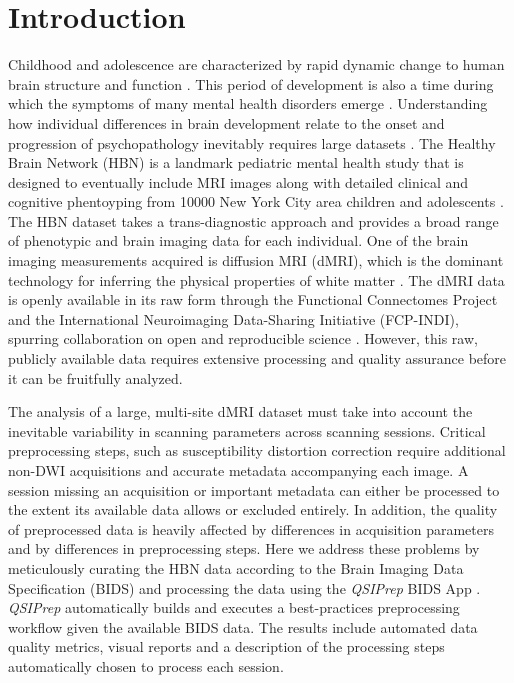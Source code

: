 \documentclass[9pt,lineno]{elife}
\begin{document}
\section{Introduction}

Childhood and adolescence are characterized by rapid dynamic change to human brain
structure and function \citep{Lebel2018-oy}. This period of development is also a time during which the
symptoms of many mental health disorders emerge \citep{Paus2008-gi}.
Understanding how individual differences in brain development relate to the onset and progression of psychopathology inevitably requires large datasets  \citep{Paus2010-qk, Fair2021-eg}.
The Healthy Brain Network (HBN) is a landmark pediatric mental health study
that is designed to eventually include MRI images along with detailed clinical and cognitive phentoyping from \num{10000} New York
City area children and adolescents \citep{alexander2017-yc}. The HBN dataset
takes a trans-diagnostic approach and provides a broad range of phenotypic and brain
imaging data for each individual. One of the brain imaging measurements acquired 
is diffusion MRI (dMRI), which is the dominant technology for inferring the
physical properties of white matter \citep{wandell2016-qt}. The dMRI
data is openly available in its raw form through the Functional Connectomes
Project and the International Neuroimaging Data-Sharing Initiative (FCP-INDI),
spurring collaboration on open and reproducible science
\citep{Mennes2013-dl}. However, this raw, publicly available data requires extensive processing and quality assurance before it can be fruitfully analyzed.

The analysis of a large, multi-site dMRI dataset must take into account the inevitable variability
in scanning parameters across scanning sessions.
Critical preprocessing steps, such as susceptibility 
distortion correction \citep{jones2010-ps} require additional non-DWI acquisitions and accurate metadata accompanying each
image.
A session missing an acquisition or important metadata can either be processed to the extent 
its available data allows or excluded entirely.
In addition, the quality of preprocessed data is heavily affected by 
differences in acquisition parameters \citep{yeh2019-kb} and by differences in preprocessing
steps.
Here we address these problems by meticulously curating
the HBN data according to the Brain Imaging Data Specification (BIDS)
\citep{gorgolewski2016-lh} and processing the data using the \emph{QSIPrep} \citep{cieslak2021-iq} 
BIDS App \citep{Gorgolewski2017-mb}. \emph{QSIPrep} automatically builds and executes a 
best-practices preprocessing workflow given the available BIDS data. The results include automated
data quality metrics, visual reports and a description of the processing steps automatically chosen to process
each session.
\end{document}

